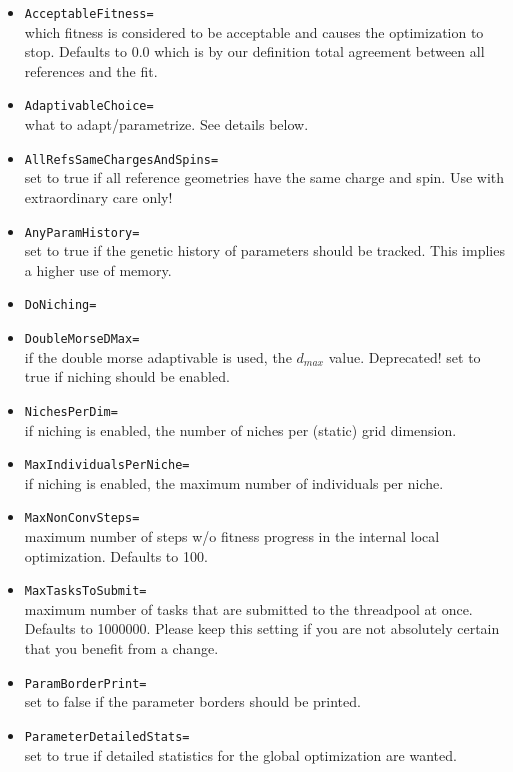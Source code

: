 \documentclass[a4paper,10pt]{scrbook}
\begin{document}
\begin{itemize}
   \item \texttt{AcceptableFitness=}\\
        \label{page2:acceptableFitness}
	which fitness is considered to be acceptable and causes the optimization
to stop. Defaults to 0.0 which is by our definition total agreement between all
references and the fit.
  \item \texttt{AdaptivableChoice=}\\
	what to adapt/parametrize. See details below.
  \item \texttt{AllRefsSameChargesAndSpins=}\\
	set to true if all reference geometries have the same charge and spin. Use
	with extraordinary care only!
  \item \texttt{AnyParamHistory=}\\
	set to true if the genetic history of parameters should be tracked. This
	implies a higher use of memory.
  \item \texttt{DoNiching=}\\
  \item \texttt{DoubleMorseDMax=}\\
	if the double morse adaptivable is used, the $d_{max}$ value. Deprecated!
	set to true if niching should be enabled.
  \item \texttt{NichesPerDim=}\\
	if niching is enabled, the number of niches per (static) grid dimension.
  \item \texttt{MaxIndividualsPerNiche=}\\
	if niching is enabled, the maximum number of individuals per niche.
  \item \texttt{MaxNonConvSteps=}\\
	maximum number of steps w/o fitness progress in the internal local
optimization. Defaults to 100.
  \item \texttt{MaxTasksToSubmit=}\\
	maximum number of tasks that are submitted to the threadpool at once.
Defaults to 1000000. Please keep this setting if you are not absolutely certain
that you benefit from a change.
  \item \texttt{ParamBorderPrint=}\\
	set to false if the parameter borders should be printed.
  \item \texttt{ParameterDetailedStats=}\\
	set to true if detailed statistics for the global optimization are wanted.

\end{itemize}
\end{document}
